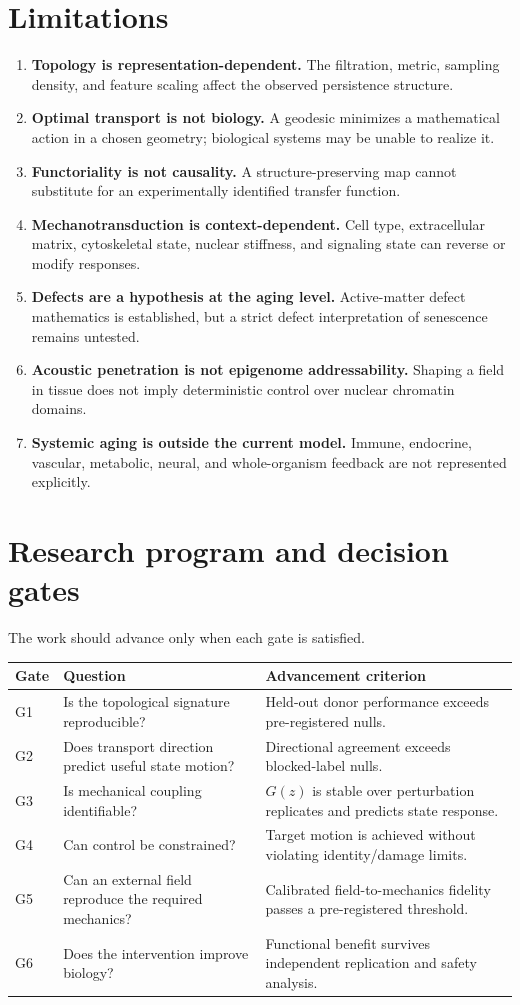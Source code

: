 \documentclass[11pt]{article}
\begin{document}
\section{Limitations}
\begin{enumerate}[leftmargin=1.45em]
\item \textbf{Topology is representation-dependent.} The filtration, metric, sampling density, and feature scaling affect the observed persistence structure.
\item \textbf{Optimal transport is not biology.} A geodesic minimizes a mathematical action in a chosen geometry; biological systems may be unable to realize it.
\item \textbf{Functoriality is not causality.} A structure-preserving map cannot substitute for an experimentally identified transfer function.
\item \textbf{Mechanotransduction is context-dependent.} Cell type, extracellular matrix, cytoskeletal state, nuclear stiffness, and signaling state can reverse or modify responses.
\item \textbf{Defects are a hypothesis at the aging level.} Active-matter defect mathematics is established, but a strict defect interpretation of senescence remains untested.
\item \textbf{Acoustic penetration is not epigenome addressability.} Shaping a field in tissue does not imply deterministic control over nuclear chromatin domains.
\item \textbf{Systemic aging is outside the current model.} Immune, endocrine, vascular, metabolic, neural, and whole-organism feedback are not represented explicitly.
\end{enumerate}

\section{Research program and decision gates}
The work should advance only when each gate is satisfied.
\begin{longtable}{p{}p{}p{}}
\toprule
Gate & Question & Advancement criterion \\
\midrule
G1 & Is the topological signature reproducible? & Held-out donor performance exceeds pre-registered nulls. \\
G2 & Does transport direction predict useful state motion? & Directional agreement exceeds blocked-label nulls. \\
G3 & Is mechanical coupling identifiable? & $G(z)$ is stable over perturbation replicates and predicts state response. \\
G4 & Can control be constrained? & Target motion is achieved without violating identity/damage limits. \\
G5 & Can an external field reproduce the required mechanics? & Calibrated field-to-mechanics fidelity passes a pre-registered threshold. \\
G6 & Does the intervention improve biology? & Functional benefit survives independent replication and safety analysis. \\
\bottomrule
\end{longtable}
\end{document}
